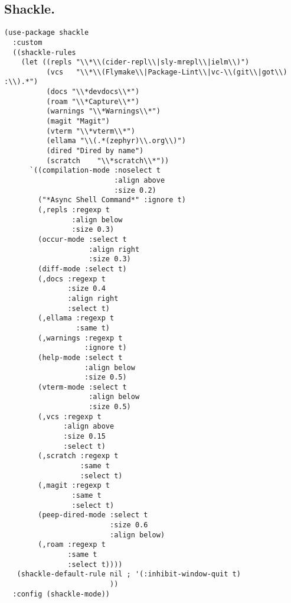 \documentclass[11pt]{article}
\begin{document}
\subsection{Shackle.}
\label{sec:org5cf809e}
\begin{verbatim}
(use-package shackle
  :custom
  ((shackle-rules
    (let ((repls "\\*\\(cider-repl\\|sly-mrepl\\|ielm\\)")
          (vcs   "\\*\\(Flymake\\|Package-Lint\\|vc-\\(git\\|got\\) :\\).*")
          (docs "\\*devdocs\\*")
          (roam "\\*Capture\\*")
          (warnings "\\*Warnings\\*")
          (magit "Magit")
          (vterm "\\*vterm\\*")
          (ellama "\\(.*(zephyr)\\.org\\)")
          (dired "Dired by name")
          (scratch    "\\*scratch\\*"))
      `((compilation-mode :noselect t
                          :align above
                          :size 0.2)
        ("*Async Shell Command*" :ignore t)
        (,repls :regexp t
                :align below
                :size 0.3)
        (occur-mode :select t
                    :align right
                    :size 0.3)
        (diff-mode :select t)
        (,docs :regexp t
               :size 0.4
               :align right
               :select t)
        (,ellama :regexp t
                 :same t)
        (,warnings :regexp t
                   :ignore t)
        (help-mode :select t
                   :align below
                   :size 0.5)
        (vterm-mode :select t
                    :align below
                    :size 0.5)
        (,vcs :regexp t
              :align above
              :size 0.15
              :select t)
        (,scratch :regexp t 
                  :same t
                  :select t)
        (,magit :regexp t 
                :same t
                :select t)
        (peep-dired-mode :select t
                         :size 0.6
                         :align below)
        (,roam :regexp t 
               :same t
               :select t))))
   (shackle-default-rule nil ; '(:inhibit-window-quit t)
                         ))
  :config (shackle-mode))
\end{verbatim}
\end{document}
